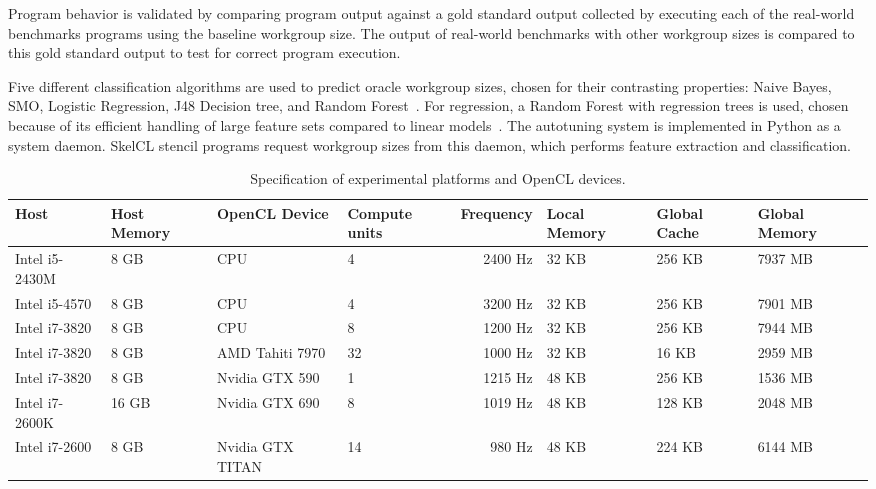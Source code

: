 Program behavior is validated by comparing program output against a
gold standard output collected by executing each of the real-world
benchmarks programs using the baseline workgroup size. The output of
real-world benchmarks with other workgroup sizes is compared to this
gold standard output to test for correct program execution.

Five different classification algorithms are used to predict oracle
workgroup sizes, chosen for their contrasting properties: Naive Bayes,
SMO, Logistic Regression, J48 Decision tree, and Random
Forest~\cite{Han2011}. For regression, a Random Forest with regression
trees is used, chosen because of its efficient handling of large
feature sets compared to linear models~\cite{Breiman1999}. The
autotuning system is implemented in Python as a system daemon. SkelCL
stencil programs request workgroup sizes from this daemon, which
performs feature extraction and classification.

\begin{table}
\tiny
\centering
\begin{tabular}{l R{1.1cm} | l R{1.1cm} r R{1.2cm} R{1.2cm} R{1.2cm}}
\toprule
Host & Host Memory &  OpenCL Device &  Compute units & Frequency & Local Memory & Global Cache & Global Memory \\
\midrule
Intel i5-2430M & 8 GB  & CPU              &              4 &   2400 Hz &        32 KB &       256 KB &       7937 MB \\
Intel i5-4570  & 8 GB  & CPU              &              4 &   3200 Hz &        32 KB &       256 KB &       7901 MB \\
Intel i7-3820  & 8 GB  & CPU              &              8 &   1200 Hz &        32 KB &       256 KB &       7944 MB \\
Intel i7-3820  & 8 GB  & AMD Tahiti 7970  &             32 &   1000 Hz &        32 KB &        16 KB &       2959 MB \\
Intel i7-3820  & 8 GB  & Nvidia GTX 590   &              1 &   1215 Hz &        48 KB &       256 KB &       1536 MB \\
Intel i7-2600K & 16 GB & Nvidia GTX 690   &              8 &   1019 Hz &        48 KB &       128 KB &       2048 MB \\
Intel i7-2600  & 8 GB  & Nvidia GTX TITAN &             14 &    980 Hz &        48 KB &       224 KB &       6144 MB \\
\bottomrule
\end{tabular}
\caption{Specification of experimental platforms and OpenCL devices.}
\label{tab:hw}
\end{table}


